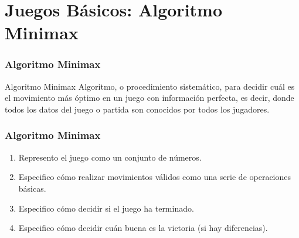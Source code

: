 \documentclass[a4paper,t,xcolor=pst,dvips,colortheme]{beamer}
\begin{document}
\section{Juegos Básicos: Algoritmo Minimax}

\begin{frame}[c]
    \frametitle{Algoritmo Minimax}
    \begin{block}{Algoritmo Minimax}
        Algoritmo, o procedimiento sistemático, para decidir cuál es el movimiento más óptimo en un juego con información perfecta, es decir, donde todos los datos del juego o partida son conocidos por todos los jugadores.
    \end{block}
\end{frame}


\begin{frame}[c]
    \frametitle{Algoritmo Minimax}
    \begin{enumerate}[<+->]
        \item Represento el juego como un conjunto de números.
        \item Especifico cómo realizar movimientos válidos como una serie de operaciones básicas.
        \item Especifico cómo decidir si el juego ha terminado.
        \item Especifico cómo decidir cuán buena es la victoria (si hay diferencias).
    \end{enumerate}
\end{frame}

\end{document}
